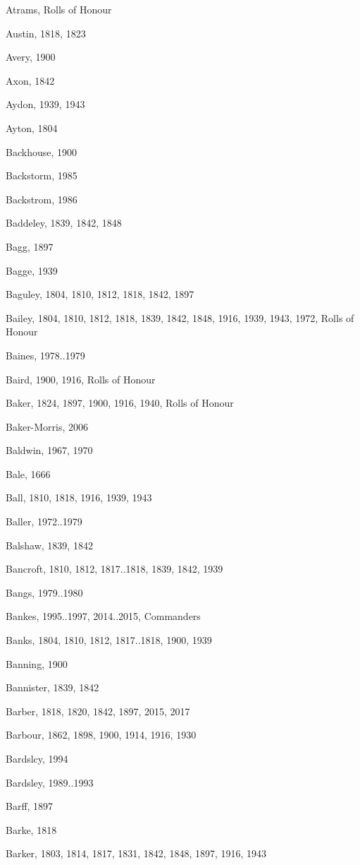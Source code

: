 \begin{theindex}
\item Atrams, Rolls of Honour
\item Austin, 1818, 1823
\item Avery, 1900
\item Axon, 1842
\item Aydon, 1939, 1943
\item Ayton, 1804
\item Backhouse, 1900
\item Backstorm, 1985
\item Backstrom, 1986
\item Baddeley, 1839, 1842, 1848
\item Bagg, 1897
\item Bagge, 1939
\item Baguley, 1804, 1810, 1812, 1818, 1842, 1897
\item Bailey, 1804, 1810, 1812, 1818, 1839, 1842, 1848, 1916, 1939, 1943, 1972, Rolls of Honour
\item Baines, 1978..1979
\item Baird, 1900, 1916, Rolls of Honour
\item Baker, 1824, 1897, 1900, 1916, 1940, Rolls of Honour
\item Baker-Morris, 2006
\item Baldwin, 1967, 1970
\item Bale, 1666
\item Ball, 1810, 1818, 1916, 1939, 1943
\item Baller, 1972..1979
\item Balshaw, 1839, 1842
\item Bancroft, 1810, 1812, 1817..1818, 1839, 1842, 1939
\item Bangs, 1979..1980
\item Bankes, 1995..1997, 2014..2015, Commanders
\item Banks, 1804, 1810, 1812, 1817..1818, 1900, 1939
\item Banning, 1900
\item Bannister, 1839, 1842
\item Barber, 1818, 1820, 1842, 1897, 2015, 2017
\item Barbour, 1862, 1898, 1900, 1914, 1916, 1930
\item Bardslcy, 1994
\item Bardsley, 1989..1993
\item Barff, 1897
\item Barke, 1818
\item Barker, 1803, 1814, 1817, 1831, 1842, 1848, 1897, 1916, 1943

\end{theindex}
